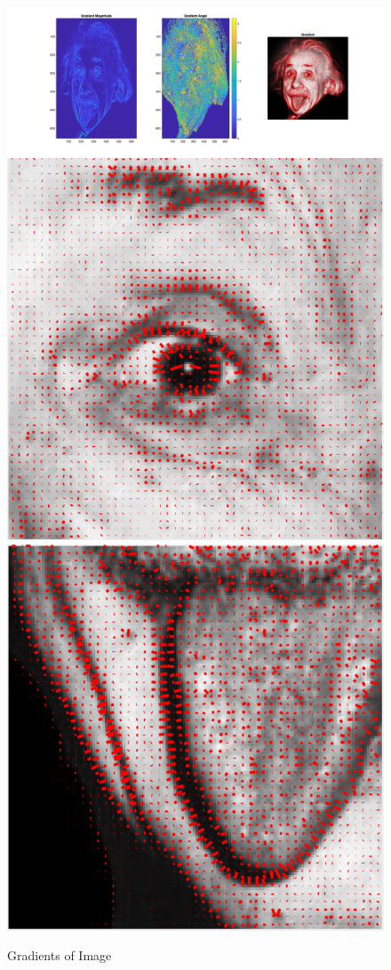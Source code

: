 \documentclass[letter, 10pt]{article}
\begin{document}
\begin{figure}[!h]
        \centering
        \includegraphics[width=\linewidth]{HW1/RESULT/GRADIENT.png}
    \endminipage\hfill
        \centering
        \includegraphics[width=0.7\linewidth]{HW1/RESULT/GRADIENT_EYE.png}
    \endminipage\hfill
        \centering
        \includegraphics[width=0.7\linewidth]{HW1/RESULT/GRADIENT_TONGUE.png}
    \endminipage\hfill
    \caption{Gradients of Image}
\end{figure}
\end{document}
